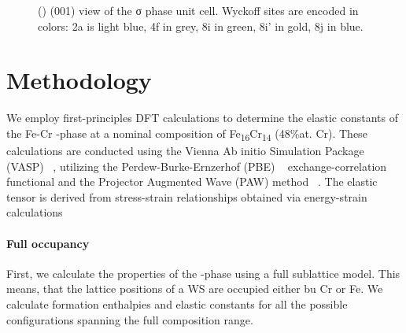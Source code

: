\documentclass[superscriptaddress, 12pt]{revtex4-2}%
\begin{document}
\begin{figure}
  \caption{\protect\label{fig:introduction}
    () (001) view of the σ phase unit cell. Wyckoff sites are encoded in colors: 2a is light blue,
    4f in grey, 8i in green, 8i' in gold, 8j in blue. 
  }
\end{figure}

\section{Methodology}

We employ first-principles DFT calculations to determine the elastic constants of the Fe-Cr \textsigma-phase at a
nominal composition of Fe\textsubscript{16}Cr\textsubscript{14} (48\%at. Cr).  These calculations are conducted using
the Vienna Ab initio Simulation Package (VASP) ~\cite{Hafner_vasp}, utilizing the Perdew-Burke-Ernzerhof (PBE)
~\cite{Perdew1996} exchange-correlation functional and the Projector Augmented Wave (PAW) method ~\cite{Bloch1994,
kresse_ultrasoft_1999}.  The elastic tensor is derived from stress-strain relationships obtained via energy-strain
calculations


\paragraph{Full occupancy}

First, we calculate the properties of the \textsigma-phase using a full sublattice model. This means, that the lattice
positions of a WS are occupied either bu Cr or Fe. We calculate formation enthalpies and elastic constants for all the
possible configurations spanning the full composition range. 
\end{document}
